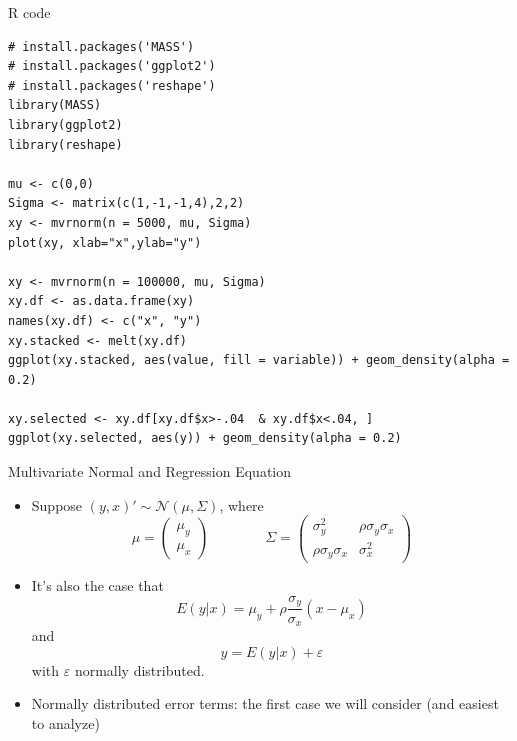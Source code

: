 \documentclass[aspectratio=169,11pt]{beamer}
\begin{document}


\begin{frame}[fragile]{ R code}
\begin{lstlisting}
# install.packages('MASS')
# install.packages('ggplot2')
# install.packages('reshape')
library(MASS)
library(ggplot2)
library(reshape)

mu <- c(0,0)
Sigma <- matrix(c(1,-1,-1,4),2,2)
xy <- mvrnorm(n = 5000, mu, Sigma)
plot(xy, xlab="x",ylab="y")

xy <- mvrnorm(n = 100000, mu, Sigma)
xy.df <- as.data.frame(xy)
names(xy.df) <- c("x", "y")
xy.stacked <- melt(xy.df)
ggplot(xy.stacked, aes(value, fill = variable)) + geom_density(alpha = 0.2)

xy.selected <- xy.df[xy.df$x>-.04  & xy.df$x<.04, ]
ggplot(xy.selected, aes(y)) + geom_density(alpha = 0.2)
\end{lstlisting}
\end{frame}


\begin{frame}{Multivariate Normal and Regression Equation}
\begin{itemize}

	\item Suppose $\left(y,x\right)' \sim \mathcal{N}\left(\mu,\Sigma\right)$, where \[
\mu=\left(\begin{array}{c}
\mu_{y}\\
\mu_{x}
\end{array}\right)\qquad\qquad\Sigma=\left(\begin{array}{cc}
\sigma_{y}^{2} & \rho\sigma_{y}\sigma_{x}\\
\rho\sigma_{y}\sigma_{x} & \sigma_{x}^{2}
\end{array}\right)
\]

	\smallskip
	\item It's also the case that \[
		E\left(y|x\right) = \mu_y + \rho\frac{\sigma_y}{\sigma_x}\left(x-\mu_x\right)
	\]
	and \[
		y = E\left(y|x\right) + \varepsilon
	\]
	with $\varepsilon$ normally distributed.

	\smallskip
	\item Normally distributed error terms: the first case we will consider (and easiest to analyze)

\end{itemize}
\end{frame}
\end{document}
